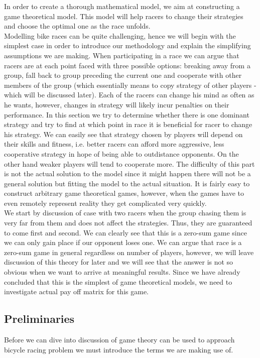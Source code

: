 \documentclass[10pt, a4paper]{report}
\begin{document}
In order to create a thorough mathematical model, we aim at constructing a game theoretical model. This model will help racers to change their strategies and choose the optimal one as the race unfolds.\\

Modelling bike races can be quite challenging, hence we will begin with the simplest case in order to introduce our methodology and explain the simplifying assumptions we are making. When participating in a race we can argue that racers are at each point faced with three possible options: breaking away from a group, fall back to group preceding the current one and cooperate with other members of the group (which essentially means to copy strategy of other players - which will be discussed later). Each of the racers can change his mind as often as he wants, however, changes in strategy will likely incur penalties on their performance. In this section we try to determine whether there is one dominant strategy and try to find at which point in race it is beneficial for racer to change his strategy. We can easily see that strategy chosen by players will depend on their skills and fitness, i.e. better racers can afford more aggressive, less cooperative strategy in hope of being able to outdistance opponents. On the other hand weaker players will tend to cooperate more. The difficulty of this part is not the actual solution to the model since it might happen there will not be a general solution but fitting the model to the actual situation. It is fairly easy to construct arbitrary game theoretical games, however, when the games have to even remotely represent reality they get complicated very quickly.\\

We start by discussion of case with two racers when the group chasing them is very far from them and does not affect the strategies. Thus, they are guaranteed to come first and second. We can clearly see that this is a zero-sum game since we can only gain place if our opponent loses one. We can argue that race is a zero-sum game in general regardless on number of players, however, we will leave discussion of this theory for later and we will see that the answer is not so obvious when we want to arrive at meaningful results. Since we have already concluded that this is the simplest of game theoretical models, we need to investigate actual pay off matrix for this game.

\subsection{Preliminaries}
Before we can dive into discussion of game theory can be used to approach bicycle racing problem we must introduce the terms we are making use of.
\end{document}
